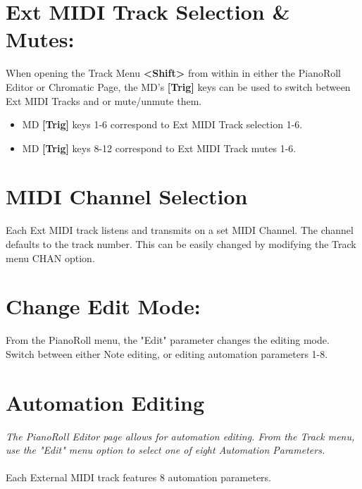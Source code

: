 \section{Ext MIDI Track Selection \& Mutes:}
When opening the Track Menu \textbf{<Shift>} from within in either the PianoRoll Editor or Chromatic Page, the MD's \textbf{[Trig]} keys can be used to switch between Ext MIDI Tracks and or  mute/unmute them.
\begin{itemize}
    \item MD \textbf{[Trig]} keys 1-6 correspond to Ext MIDI Track selection 1-6.
    \item MD \textbf{[Trig]} keys 8-12 correspond to Ext MIDI Track mutes 1-6.
\end{itemize}

\section{MIDI Channel Selection}
Each Ext MIDI track listens and transmits on a set MIDI Channel. The channel defaults to the track number. This can be easily changed by modifying the Track  menu CHAN option.\\
\newpage
\section{Change Edit Mode:}
From the PianoRoll menu, the "Edit" parameter changes the editing mode. Switch between either Note editing, or editing automation parameters 1-8.

\section{Automation Editing}
\textit{The PianoRoll Editor page allows for automation editing. From the Track menu, use the "Edit" menu option to select one of eight Automation Parameters.}
\\\\
Each External MIDI track features 8 automation parameters.\\
